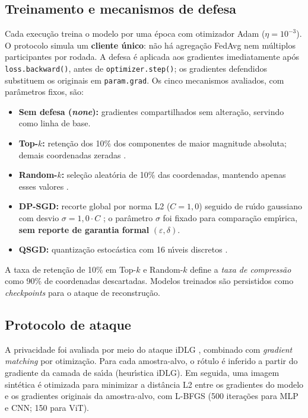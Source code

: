 \documentclass[kdmile,a4paper]{kdmile}
\begin{document}
\subsection{Treinamento e mecanismos de defesa}

Cada execu\c{c}\~{a}o treina o modelo por uma \'{e}poca com otimizador Adam ($\eta = 10^{-3}$). O protocolo simula um \textbf{cliente \'{u}nico}: n\~{a}o h\'{a} agrega\c{c}\~{a}o FedAvg nem m\'{u}ltiplos participantes por rodada. A defesa \'{e} aplicada aos gradientes imediatamente ap\'{o}s \texttt{loss.backward()}, antes de \texttt{optimizer.step()}; os gradientes defendidos substituem os originais em \texttt{param.grad}. Os cinco mecanismos avaliados, com par\^{a}metros fixos, s\~{a}o:

\begin{itemize}
\item \textbf{Sem defesa (\textit{none}):} gradientes compartilhados sem altera\c{c}\~{a}o, servindo como linha de base.
\item \textbf{Top-$k$:} reten\c{c}\~{a}o dos 10\% dos componentes de maior magnitude absoluta; demais coordenadas zeradas \cite{Stich2018}.
\item \textbf{Random-$k$:} sele\c{c}\~{a}o aleat\'{o}ria de 10\% das coordenadas, mantendo apenas esses valores \cite{Wangni2018}.
\item \textbf{DP-SGD:} recorte global por norma L2 ($C = 1{,}0$) seguido de ru\'{\i}do gaussiano com desvio $\sigma = 1{,}0 \cdot C$ \cite{Abadi2016}; o par\^{a}metro $\sigma$ foi fixado para compara\c{c}\~{a}o emp\'{\i}rica, \textbf{sem reporte de garantia formal} $(\varepsilon, \delta)$.
\item \textbf{QSGD:} quantiza\c{c}\~{a}o estoc\'{a}stica com 16 n\'{\i}veis discretos \cite{Alistarh2017}.
\end{itemize}

A taxa de reten\c{c}\~{a}o de 10\% em Top-$k$ e Random-$k$ define a \textit{taxa de compress\~{a}o} como 90\% de coordenadas descartadas. Modelos treinados s\~{a}o persistidos como \textit{checkpoints} para o ataque de reconstru\c{c}\~{a}o.

\subsection{Protocolo de ataque}

A privacidade foi avaliada por meio do ataque iDLG \cite{Zhao2020}, combinado com \textit{gradient matching} por otimiza\c{c}\~{a}o. Para cada amostra-alvo, o r\'{o}tulo \'{e} inferido a partir do gradiente da camada de sa\'{\i}da (heur\'{\i}stica iDLG). Em seguida, uma imagem sint\'{e}tica \'{e} otimizada para minimizar a dist\^{a}ncia L2 entre os gradientes do modelo e os gradientes originais da amostra-alvo, com L-BFGS (500 itera\c{c}\~{o}es para MLP e CNN; 150 para ViT).
\end{document}
